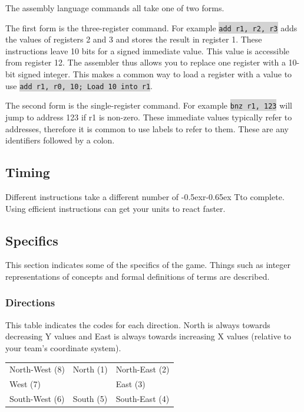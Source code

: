 \documentclass{article}
\newcommand{\vnscode}[1]{\colorbox{lightgray}{\lstinline[language=vns]{#1}}}
\newcommand{\RT}{\lower-0.5ex\hbox{r}\kern-0.65ex T}
\begin{document}
The assembly language commands all take one of two forms.

The first form is the three-register command. For example \vnscode{add r1, r2,
r3} adds the values of registers 2 and 3 and stores the result in register 1.
These instructions leave 10 bits for a signed immediate value. This value is
accessible from register 12.  The assembler thus allows you to replace one
register with a 10-bit signed integer. This makes a common way to load a
register with a value to use \vnscode{add r1, r0, 10; Load 10 into r1}.

The second form is the single-register command. For example \vnscode{bnz r1,
123} will jump to address 123 if r1 is non-zero. These immediate values
typically refer to addresses, therefore it is common to use labels to refer to
them. These are any identifiers followed by a colon.

\subsection{Timing}

Different instructions take a different number of \RT to complete. Using
efficient instructions can get your units to react faster.

\subsection{Specifics}

This section indicates some of the specifics of the game. Things such as integer
representations of concepts and formal definitions of terms are described.

\subsubsection{Directions}

This table indicates the codes for each direction. North is always towards
decreasing Y values and East is always towards increasing X values (relative to
your team's coordinate system).

\begin{minipage}{\textwidth}
\centering
\begin{tabular}{lll}
    North-West (8) & North (1) & North-East (2) \\
    West (7) & & East (3) \\
    South-West (6) & South (5) & South-East (4) \\
\end{tabular}
\end{minipage}
\end{document}
